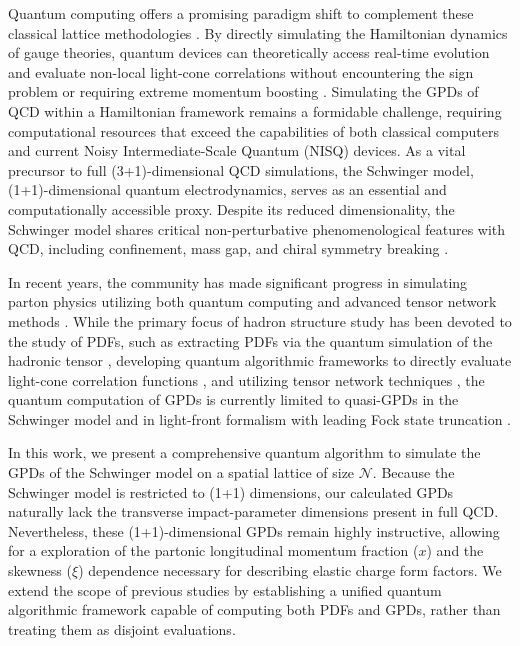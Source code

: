 \documentclass[aps,prd,twocolumn,superscriptaddress,notitlepage,nofootinbib,preprintnumbers]{revtex4-1}
\begin{document}
Quantum computing offers a promising paradigm shift to complement these classical lattice methodologies \cite{Fang:2024ple,Zhang:2020uqo,Bauer:2022hpo,Bauer:2023qgm,Banuls:2019bmf}. By directly simulating the Hamiltonian dynamics of gauge theories, quantum devices can theoretically access real-time evolution \cite{Jordan:2012xnu} and evaluate non-local light-cone correlations without encountering the sign problem or requiring extreme momentum boosting \cite{Low:2022jxj}. 
Simulating the GPDs of QCD within a Hamiltonian framework remains a formidable challenge, requiring computational resources that exceed the capabilities of both classical computers and current Noisy Intermediate-Scale Quantum (NISQ) devices. 
As a vital precursor to full (3+1)-dimensional QCD simulations, the Schwinger model, (1+1)-dimensional quantum electrodynamics, serves as an essential and computationally accessible proxy. Despite its reduced dimensionality, the Schwinger model shares critical non-perturbative phenomenological features with QCD, including confinement, mass gap, and chiral symmetry breaking \cite{Banuls:2019bmf}.

In recent years, the community has made significant progress in simulating parton physics utilizing both quantum computing and advanced tensor network methods \cite{Bepari:2021kwv,Li:2022lyt,Barata:2022wim,Li:2023kex,Chawdhry:2023jks,Lee:2023urk,Bauer:2023ujy,Du:2023ewh,Grieninger:2024axp,Li:2024nod,Qian:2024gph,Zhang:2024fgv,Kang:2025xpz,Janik:2025bbz,Banuls:2025wiq,Chen:2025zeh,Chawdhry:2025iuz,Artiaco:2025qqq,Barata:2026icn,Zou:2026cfk,Fernando:2026vqf}. While the primary focus of hadron structure study has been devoted to the study of PDFs, such as extracting PDFs via the quantum simulation of the hadronic tensor \cite{Lamm:2019uyc,Zou:2026cfk,Ikeda:2025bjb}, developing quantum algorithmic frameworks to directly evaluate light-cone correlation functions \cite{Li:2021kcs,Chen:2025zeh}, and utilizing tensor network techniques \cite{Grieninger:2024cdl,Schneider:2024yub,Kang:2025xpz,Banuls:2025wiq}, the quantum computation of GPDs is currently limited to quasi-GPDs in the Schwinger model \cite{Grieninger:2025mbm} and in light-front formalism with leading Fock state truncation \cite{Gustin:2022pfu}.

In this work, we present a comprehensive quantum algorithm to simulate the GPDs of the Schwinger model on a spatial lattice of size $\mathcal{N}$. Because the Schwinger model is restricted to (1+1) dimensions, our calculated GPDs naturally lack the transverse impact-parameter dimensions present in full QCD. Nevertheless, these (1+1)-dimensional GPDs remain highly instructive, allowing for a exploration of the partonic longitudinal momentum fraction ($x$) and the skewness ($\xi$) dependence necessary for describing elastic charge form factors. We extend the scope of previous studies by establishing a unified quantum algorithmic framework capable of computing both PDFs and GPDs, rather than treating them as disjoint evaluations.
\end{document}
